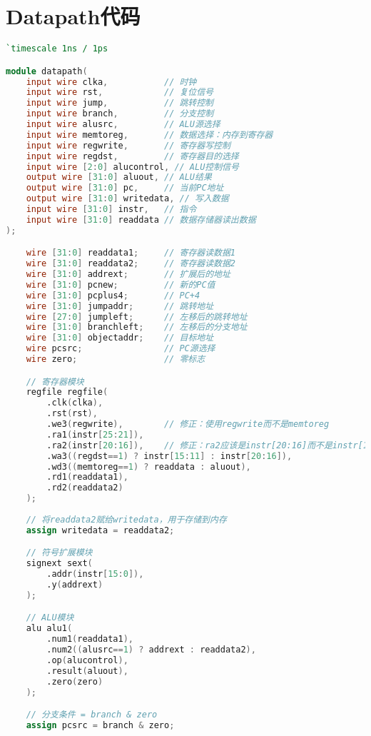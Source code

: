 \appendix
\newpage
\section{Datapath代码}
\begin{lstlisting}[language=Verilog]
`timescale 1ns / 1ps

module datapath(
    input wire clka,           // 时钟
    input wire rst,            // 复位信号
    input wire jump,           // 跳转控制
    input wire branch,         // 分支控制
    input wire alusrc,         // ALU源选择
    input wire memtoreg,       // 数据选择：内存到寄存器
    input wire regwrite,       // 寄存器写控制
    input wire regdst,         // 寄存器目的选择
    input wire [2:0] alucontrol, // ALU控制信号
    output wire [31:0] aluout, // ALU结果
    output wire [31:0] pc,     // 当前PC地址
    output wire [31:0] writedata, // 写入数据
    input wire [31:0] instr,   // 指令
    input wire [31:0] readdata // 数据存储器读出数据
);

    wire [31:0] readdata1;     // 寄存器读数据1
    wire [31:0] readdata2;     // 寄存器读数据2
    wire [31:0] addrext;       // 扩展后的地址
    wire [31:0] pcnew;         // 新的PC值
    wire [31:0] pcplus4;       // PC+4
    wire [31:0] jumpaddr;      // 跳转地址
    wire [27:0] jumpleft;      // 左移后的跳转地址
    wire [31:0] branchleft;    // 左移后的分支地址
    wire [31:0] objectaddr;    // 目标地址
    wire pcsrc;                // PC源选择
    wire zero;                 // 零标志

    // 寄存器模块
    regfile regfile(
        .clk(clka),
        .rst(rst),
        .we3(regwrite),        // 修正：使用regwrite而不是memtoreg
        .ra1(instr[25:21]),
        .ra2(instr[20:16]),    // 修正：ra2应该是instr[20:16]而不是instr[15:11]
        .wa3((regdst==1) ? instr[15:11] : instr[20:16]),
        .wd3((memtoreg==1) ? readdata : aluout),
        .rd1(readdata1),
        .rd2(readdata2)
    );
    
    // 将readdata2赋给writedata，用于存储到内存
    assign writedata = readdata2;

    // 符号扩展模块
    signext sext(
        .addr(instr[15:0]),
        .y(addrext)
    );

    // ALU模块
    alu alu1(
        .num1(readdata1),
        .num2((alusrc==1) ? addrext : readdata2),
        .op(alucontrol),
        .result(aluout),
        .zero(zero)
    );

    // 分支条件 = branch & zero
    assign pcsrc = branch & zero;


\end{lstlisting}

